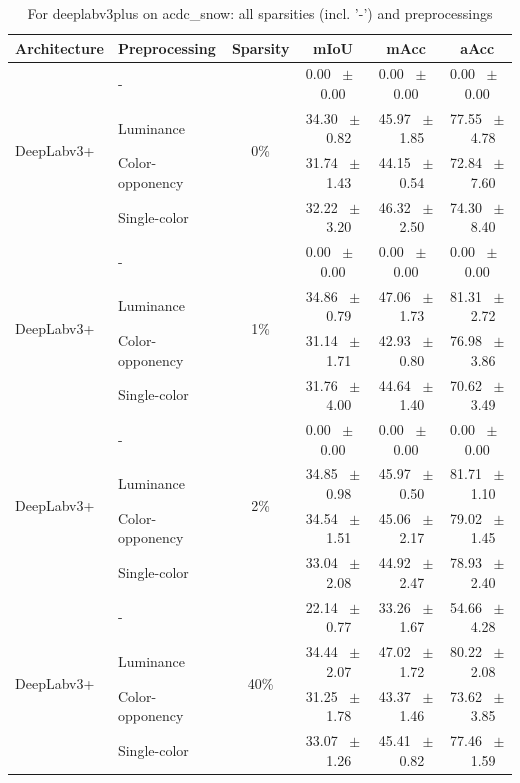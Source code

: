 \begin{table}[h]
  \centering
  \caption{For deeplabv3plus on acdc_snow: all sparsities (incl. '-') and preprocessings}
  \begin{tabular}{@{}l l c c c c@{}}
    \toprule
    Architecture & Preprocessing & Sparsity & mIoU & mAcc & aAcc \\
    \midrule
    \multirow{4}{*}{DeepLabv3+} & - & \multirow{4}{*}{0\%} & 0.00 ~$\pm$~ 0.00 & 0.00 ~$\pm$~ 0.00 & 0.00 ~$\pm$~ 0.00 \\
    & Luminance &  & 34.30 ~$\pm$~ 0.82 & 45.97 ~$\pm$~ 1.85 & 77.55 ~$\pm$~ 4.78 \\
    & Color-opponency &  & 31.74 ~$\pm$~ 1.43 & 44.15 ~$\pm$~ 0.54 & 72.84 ~$\pm$~ 7.60 \\
    & Single-color &  & 32.22 ~$\pm$~ 3.20 & 46.32 ~$\pm$~ 2.50 & 74.30 ~$\pm$~ 8.40 \\
    \midrule
    \multirow{4}{*}{DeepLabv3+} & - & \multirow{4}{*}{1\%} & 0.00 ~$\pm$~ 0.00 & 0.00 ~$\pm$~ 0.00 & 0.00 ~$\pm$~ 0.00 \\
    & Luminance &  & 34.86 ~$\pm$~ 0.79 & 47.06 ~$\pm$~ 1.73 & 81.31 ~$\pm$~ 2.72 \\
    & Color-opponency &  & 31.14 ~$\pm$~ 1.71 & 42.93 ~$\pm$~ 0.80 & 76.98 ~$\pm$~ 3.86 \\
    & Single-color &  & 31.76 ~$\pm$~ 4.00 & 44.64 ~$\pm$~ 1.40 & 70.62 ~$\pm$~ 3.49 \\
    \midrule
    \multirow{4}{*}{DeepLabv3+} & - & \multirow{4}{*}{2\%} & 0.00 ~$\pm$~ 0.00 & 0.00 ~$\pm$~ 0.00 & 0.00 ~$\pm$~ 0.00 \\
    & Luminance &  & 34.85 ~$\pm$~ 0.98 & 45.97 ~$\pm$~ 0.50 & 81.71 ~$\pm$~ 1.10 \\
    & Color-opponency &  & 34.54 ~$\pm$~ 1.51 & 45.06 ~$\pm$~ 2.17 & 79.02 ~$\pm$~ 1.45 \\
    & Single-color &  & 33.04 ~$\pm$~ 2.08 & 44.92 ~$\pm$~ 2.47 & 78.93 ~$\pm$~ 2.40 \\
    \midrule
    \multirow{4}{*}{DeepLabv3+} & - & \multirow{4}{*}{40\%} & 22.14 ~$\pm$~ 0.77 & 33.26 ~$\pm$~ 1.67 & 54.66 ~$\pm$~ 4.28 \\
    & Luminance &  & 34.44 ~$\pm$~ 2.07 & 47.02 ~$\pm$~ 1.72 & 80.22 ~$\pm$~ 2.08 \\
    & Color-opponency &  & 31.25 ~$\pm$~ 1.78 & 43.37 ~$\pm$~ 1.46 & 73.62 ~$\pm$~ 3.85 \\
    & Single-color &  & 33.07 ~$\pm$~ 1.26 & 45.41 ~$\pm$~ 0.82 & 77.46 ~$\pm$~ 1.59 \\
    \midrule

\end{tabular}
\end{table}
